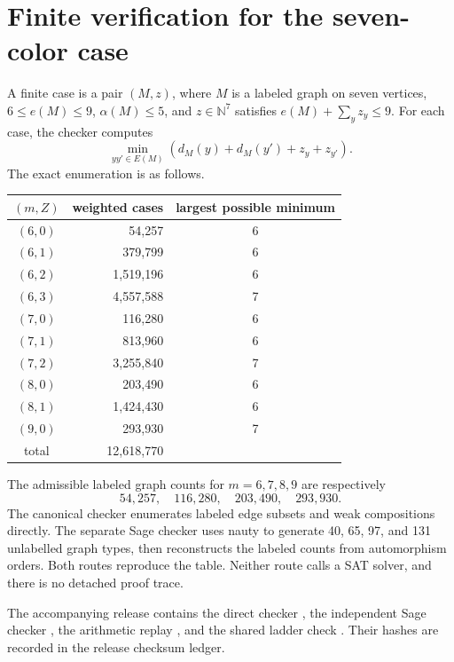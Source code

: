 \documentclass[11pt,reqno,a4paper]{amsart}
\theoremstyle{definition}
\theoremstyle{remark}
\begin{document}
\section{Finite verification for the seven-color case}\label{sec:finite-r7}

A finite case is a pair $(M,z)$, where $M$ is a labeled graph on seven
vertices, $6\leq e(M)\leq9$, $\alpha(M)\leq5$, and
$z\in\mathbb N^7$ satisfies $e(M)+\sum_yz_y\leq9$. For each case, the
checker computes
\[
  \min_{yy'\in E(M)}
  \left(d_M(y)+d_M(y')+z_y+z_{y'}\right).
\]
The exact enumeration is as follows.

\begin{center}
\begin{tabular}{c@{\qquad}r@{\qquad}c}
\toprule
$(m,Z)$&weighted cases&largest possible minimum\\
\midrule
$(6,0)$&54,257&6\\
$(6,1)$&379,799&6\\
$(6,2)$&1,519,196&6\\
$(6,3)$&4,557,588&7\\
$(7,0)$&116,280&6\\
$(7,1)$&813,960&6\\
$(7,2)$&3,255,840&7\\
$(8,0)$&203,490&6\\
$(8,1)$&1,424,430&6\\
$(9,0)$&293,930&7\\
\midrule
total&12,618,770&\\
\bottomrule
\end{tabular}
\end{center}

The admissible labeled graph counts for $m=6,7,8,9$ are respectively
\[
  54{,}257,\quad116{,}280,\quad203{,}490,\quad293{,}930.
\]
The canonical checker enumerates labeled edge subsets and weak
compositions directly. The separate Sage checker uses nauty
\cite{McKayPiperno2014} to generate
40, 65, 97, and 131 unlabelled graph types, then reconstructs the labeled
counts from automorphism orders. Both routes reproduce the table. Neither
route calls a SAT solver, and there is no detached proof trace.

The accompanying release contains the direct checker
, the independent Sage checker
, the arithmetic replay
, and the shared ladder check
. Their hashes are recorded in the
release checksum ledger.
\end{document}
